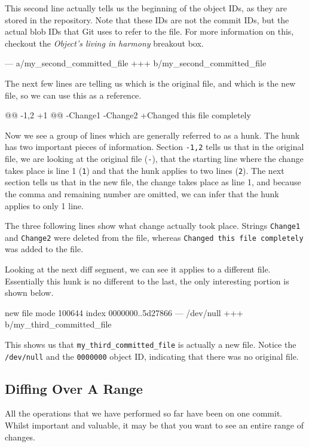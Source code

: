 This second line actually tells us the beginning of the object IDs, as they are stored in the repository.
Note that these IDs are not the commit IDs, but the actual blob IDs that Git uses to refer to the file.
For more information on this, checkout the \emph{Object's living in harmony} breakout box.

\begin{code}
--- a/my_second_committed_file
+++ b/my_second_committed_file
\end{code}

The next few lines are telling us which is the original file, and which is the new file, so we can use this as a reference.

\begin{code}
@@ -1,2 +1 @@
-Change1
-Change2
+Changed this file completely
\end{code}

Now we see a group of lines which are generally referred to as a hunk.
The hunk has two important pieces of information.
Section \texttt{-1,2} tells us that in the original file, we are looking at the original file (\texttt{-}), that the starting line where the change takes place is line 1 (\texttt{1}) and that the hunk applies to two lines (\texttt{2}).
The next section tells us that in the new file, the change takes place as line 1, and because the comma and remaining number are omitted, we can infer that the hunk applies to only 1 line.

The three following lines show what change actually took place.
Strings \texttt{Change1} and \texttt{Change2} were deleted from the file, whereas \texttt{Changed this file completely} was added to the file.

Looking at the next diff segment, we can see it applies to a different file.
Essentially this hunk is no different to the last, the only interesting portion is shown below.

\begin{code}
new file mode 100644
index 0000000..5d27866
--- /dev/null
+++ b/my_third_committed_file
\end{code}

This shows us that \texttt{my\_third\_committed\_file} is actually a new file.
Notice the \texttt{/dev/null} and the \texttt{0000000} object ID, indicating that there was no original file.

\subsection{Diffing Over A Range}
All the operations that we have performed so far have been on one commit.
Whilst important and valuable, it may be that you want to see an entire range of changes.

